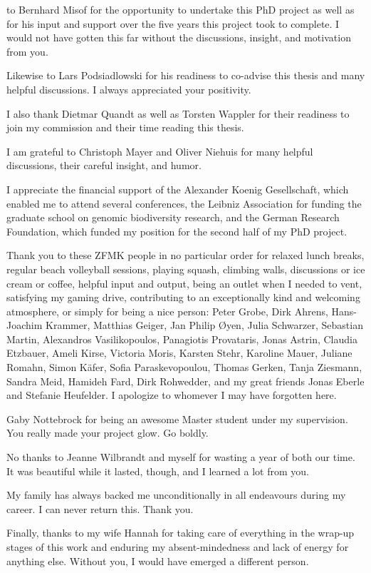 
 to Bernhard Misof for the opportunity to
undertake this PhD project as well as for his input and support over the
five years this project took to complete.  I would not have gotten this
far without the discussions, insight, and motivation from you.

Likewise to Lars Podsiadlowski for his readiness to co-advise this
thesis and many helpful discussions.  I always appreciated your
positivity.

I also thank Dietmar Quandt as well as Torsten Wappler for their
readiness to join my commission and their time reading this thesis.

I am grateful to Christoph Mayer and Oliver Niehuis for many helpful
discussions, their careful insight, and humor.

I appreciate the financial support of the Alexander Koenig Gesellschaft,
which enabled me to attend several conferences, the Leibniz Association for
funding the graduate school on genomic biodiversity research, and the German
Research Foundation, which funded my position for the second half of my PhD
project.

Thank you to these ZFMK people in no particular order for relaxed lunch
breaks, regular beach volleyball sessions, playing squash, climbing
walls, discussions or ice cream or coffee, helpful input and output,
being an outlet when I needed to vent, satisfying my gaming drive,
contributing to an exceptionally kind and welcoming atmosphere, or
simply for being a nice person:
%
Peter Grobe, Dirk Ahrens, Hans-Joachim Krammer, Matthias Geiger, Jan
Philip \O{}yen, Julia Schwarzer, Sebastian Martin, Alexandros
Vasilikopoulos, Panagiotis Provataris, Jonas Astrin, Claudia Etzbauer,
Ameli Kirse, Victoria Moris, Karsten Stehr, Karoline Mauer, Juliane
Romahn, Simon K\"afer, Sofia Paraskevopoulou, Thomas Gerken, Tanja
Ziesmann, Sandra Meid, Hamideh Fard, Dirk Rohwedder, and my great
friends Jonas Eberle and Stefanie Heufelder.  I apologize to whomever I
may have forgotten here.

Gaby Nottebrock for being an awesome Master student under my
supervision.  You really made your project glow.  Go boldly.

No thanks to Jeanne Wilbrandt and myself for wasting a year of both our
time.  It was beautiful while it lasted, though, and I learned a lot
from you.

My family has always backed me unconditionally in all endeavours during
my career.  I can never return this.  Thank you.

Finally, thanks to my wife Hannah for taking care of everything in the
wrap-up stages of this work and enduring my absent-mindedness and lack
of energy for anything else.  Without you, I would have emerged a
different person.
